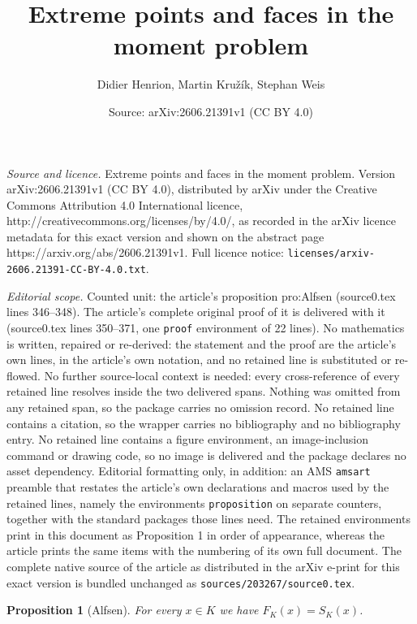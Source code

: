 \documentclass[10pt,a4paper]{amsart}
\title{Extreme points and faces in the moment problem}
\author{Didier Henrion, Martin Kru\v{z}\'ik, Stephan Weis}
\date{Source: arXiv:2606.21391v1 (CC BY 4.0)}
\newtheorem{proposition}{Proposition}
\begin{document}
\maketitle

\noindent\emph{Source and licence.} Extreme points and faces in the moment problem. Version arXiv:2606.21391v1 (CC BY 4.0), distributed by arXiv under the Creative Commons Attribution 4.0 International licence, http://creativecommons.org/licenses/by/4.0/, as recorded in the arXiv licence metadata for this exact version and shown on the abstract page https://arxiv.org/abs/2606.21391v1. Full licence notice: \texttt{licenses/arxiv-2606.21391-CC-BY-4.0.txt}.\par\smallskip

\noindent\textit{Editorial scope.} Counted unit: the article's proposition pro:Alfsen (source0.tex lines 346--348). The article's complete original proof of it is delivered with it (source0.tex lines 350--371, one \texttt{proof} environment of 22 lines). No mathematics is written, repaired or re-derived: the statement and the proof are the article's own lines, in the article's own notation, and no retained line is substituted or re-flowed.  No further source-local context is needed: every cross-reference of every retained line resolves inside the two delivered spans.  Nothing was omitted from any retained span, so the package carries no omission record.  No retained line contains a citation, so the wrapper carries no bibliography and no bibliography entry.  No retained line contains a figure environment, an image-inclusion command or drawing code, so no image is delivered and the package declares no asset dependency.  Editorial formatting only, in addition: an AMS \texttt{amsart} preamble that restates the article's own declarations and macros used by the retained lines, namely the environments \texttt{proposition} on separate counters, together with the standard packages those lines need.  The retained environments print in this document as Proposition 1 in order of appearance, whereas the article prints the same items with the numbering of its own full document.  The complete native source of the article as distributed in the arXiv e-print for this exact version is bundled unchanged as \texttt{sources/203267/source0.tex}.
\begin{proposition}[Alfsen]\label{pro:Alfsen}
For every $x\in K$ we have $F_K(x)=S_K(x)$.
\end{proposition}
\end{document}
